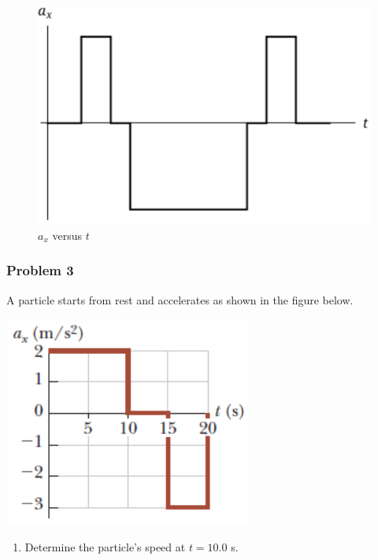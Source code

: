 \documentclass[
  letterpaper,
  DIV=11,
  numbers=noendperiod]{scrartcl}
\providecommand{\tightlist}{%
  \setlength{\itemsep}{0pt}\setlength{\parskip}{0pt}}\usepackage{longtable,booktabs,array}
\begin{document}
\begin{figure}[!htb]
\begin{center}
   \begin{minipage}{0.48\textwidth}
     \includegraphics[width=\linewidth]{img/Acceleration Definitions HW/axversust.png}
     \caption*{$a_x$ versus $t$}
  \end{minipage}\hfill
\end{center}
\end{figure}

\newpage{}

\hypertarget{problem-3-2}{%
\subsubsection{Problem 3}\label{problem-3-2}}

A particle starts from rest and accelerates as shown in the figure
below.

\includegraphics{img/Acceleration Definitions HW/problem3.png}

\begin{enumerate}
\def\labelenumi{(\alph{enumi})}
\tightlist
\item
  Determine the particle's speed at \(t = 10.0\) s.
\end{enumerate}
\end{document}
